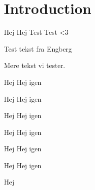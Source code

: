 \chapter{Introduction}
Hej Hej Test Test <3

Test tekst fra Engberg

Mere tekst vi tester.

\begin{defn}{Hej}
Hej igen
\end{defn}

\begin{thmx}{Hej}
Hej igen
\end{thmx}


\begin{lem}{Hej}
Hej igen
\end{lem}

\begin{prop}{Hej}
Hej igen
\end{prop}

\begin{kor}{Hej}
Hej igen
\end{kor}

\begin{exmp}{Hej}
Hej igen
\end{exmp}

\begin{bev}
Hej
\end{bev}
